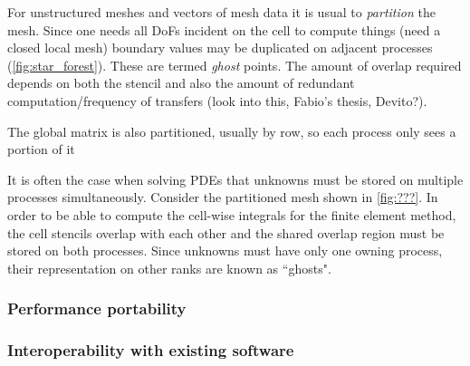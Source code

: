 \documentclass[thesis]{subfiles}
\begin{document}
For unstructured meshes and vectors of mesh data it is usual to \textit{partition} the mesh.
Since one needs all DoFs incident on the cell to compute things (need a closed local mesh) boundary values may be duplicated on adjacent processes (\cref{fig:star_forest}).
These are termed \textit{ghost} points.
The amount of overlap required depends on both the stencil and also the amount of redundant computation/frequency of transfers (look into this, Fabio's thesis, Devito?).

The global matrix is also partitioned, usually by row, so each process only sees a portion of it

It is often the case when solving PDEs that unknowns must be stored on multiple processes simultaneously.
Consider the partitioned mesh shown in \cref{fig:???}.
In order to be able to compute the cell-wise integrals for the finite element method, the cell stencils overlap with each other and the shared overlap region must be stored on both processes.
Since unknowns must have only one owning process, their representation on other ranks are known as ``ghosts".



\subsubsection{Performance portability}





\subsubsection{Interoperability with existing software}
\end{document}
